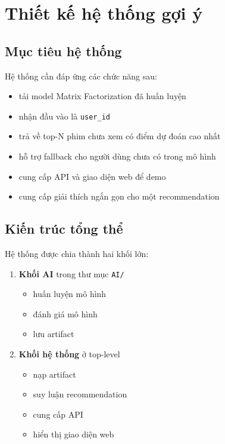 \documentclass[12pt,a4paper]{article}
\begin{document}
\section{Thiết kế hệ thống gợi ý}

\subsection{Mục tiêu hệ thống}

Hệ thống cần đáp ứng các chức năng sau:

\begin{itemize}[leftmargin=1.5cm]
    \item tải model Matrix Factorization đã huấn luyện
    \item nhận đầu vào là \texttt{user\_id}
    \item trả về top-N phim chưa xem có điểm dự đoán cao nhất
    \item hỗ trợ fallback cho người dùng chưa có trong mô hình
    \item cung cấp API và giao diện web để demo
    \item cung cấp giải thích ngắn gọn cho một recommendation
\end{itemize}

\subsection{Kiến trúc tổng thể}

Hệ thống được chia thành hai khối lớn:

\begin{enumerate}[leftmargin=1.5cm]
    \item \textbf{Khối AI} trong thư mục \texttt{AI/}
    \begin{itemize}[leftmargin=1.2cm]
        \item huấn luyện mô hình
        \item đánh giá mô hình
        \item lưu artifact
    \end{itemize}
    \item \textbf{Khối hệ thống} ở top-level
    \begin{itemize}[leftmargin=1.2cm]
        \item nạp artifact
        \item suy luận recommendation
        \item cung cấp API
        \item hiển thị giao diện web
    \end{itemize}
\end{enumerate}
\end{document}
